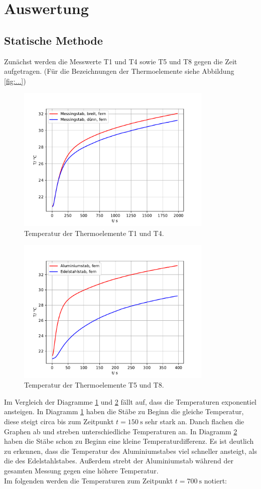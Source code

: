 \section{Auswertung}

\subsection{Statische Methode}
Zunächst werden die Messwerte T1 und T4 sowie T5 und T8 gegen die Zeit aufgetragen.
(Für die Bezeichnungen der Thermoelemente siehe Abbildung \ref{fig:...})
\begin{figure}[H]
  \centering
  \includegraphics[height=7cm]{T14.pdf}
  \caption{Temperatur der Thermoelemente T1 und T4.}
  \label{fig:T14}
\end{figure}
\begin{figure}[H]
  \centering
  \includegraphics[height=7cm]{T58.pdf}
  \caption{Temperatur der Thermoelemente T5 und T8.}
  \label{fig:T58}
\end{figure}
Im Vergleich der Diagramme \ref{fig:T14} und \ref{fig:T58} fällt auf, dass
die Temperaturen exponentiel ansteigen. In Diagramm \ref{fig:T14} haben die
Stäbe zu Beginn die gleiche Temperatur, diese steigt circa bis zum Zeitpunkt
$t=\SI{150}{\s}$ sehr stark an. Danch flachen die Graphen ab und streben unterschiedliche
Temperaturen an. In Diagramm \ref{fig:T58} haben die Stäbe schon zu Beginn eine kleine
Temperaturdifferenz. Es ist deutlich zu erkennen, dass die Temperatur des
Aluminiumstabes viel schneller ansteigt, als die des Edelstahlstabes. Außerdem
strebt der Aluminiumstab während der gesamten Messung gegen eine höhere Temperatur.\\
Im folgenden werden die Temperaturen zum Zeitpunkt $t=\SI{700}{\s}$ notiert:

